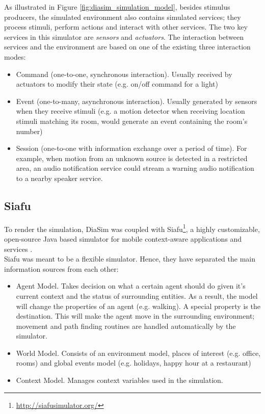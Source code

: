 As illustrated in Figure \ref{fig:diasim_simulation_model}, besides stimulus producers, the simulated environment also contains simulated services; they process stimuli, perform actions and interact with other services. The two key services in this simulator are \emph{sensors} and \emph{actuators}. The interaction between services and the environment are based on one of the existing three interaction modes:
\begin{itemize}
	\item Command (one-to-one, synchronous interaction). Usually received by actuators to modify their state (e.g. on/off command for a light)
	\item Event (one-to-many, asynchronous interaction). Usually generated by sensors when they receive stimuli (e.g. a motion detector when receiving location stimuli matching its room, would generate an event containing the room's number)
	\item Session (one-to-one with information exchange over a period of time). For example, when motion from an unknown source is detected in a restricted area, an audio notification service could stream a warning audio notification to a nearby speaker service.
\end{itemize}

\subsection{Siafu}\label{sub:siafu}
To render the simulation, DiaSim was coupled with Siafu\footnote{\url{http://siafusimulator.org/}}, a highly customizable, open-source Java based simulator for mobile context-aware applications and services \cite{martin2006generic}.\\

Siafu was meant to be a flexible simulator. Hence, they have separated the main information sources from each other:
\begin{itemize}
	\item Agent Model. Takes decision on what a certain agent should do given it's current context and the status of surrounding entities. As a result, the model will change the properties of an agent (e.g. walking). A special property is the destination. This will make the agent move in the surrounding environment; movement and path finding routines are handled automatically by the simulator.
	\item World Model. Consists of an environment model, places of interest (e.g. office, rooms) and global events model (e.g. holidays, happy hour at a restaurant)
	\item Context Model. Manages context variables used in the simulation.
\end{itemize}

